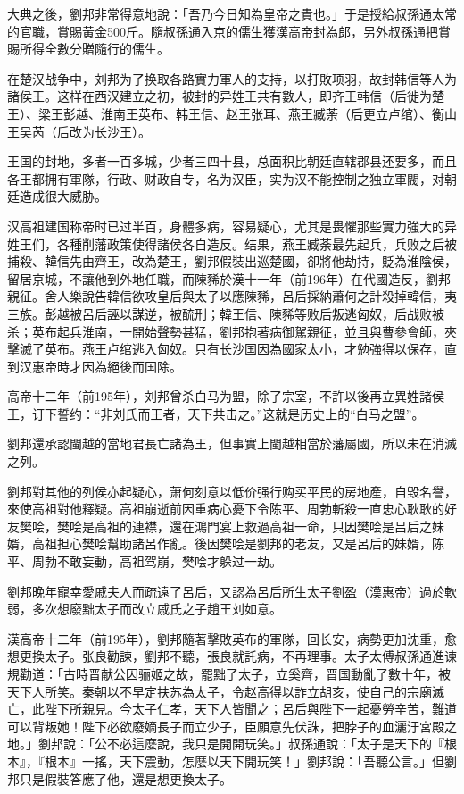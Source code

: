 大典之後，劉邦非常得意地說：「吾乃今日知為皇帝之貴也。」于是授給叔孫通太常的官職，賞賜黃金500斤。隨叔孫通入京的儒生獲漢高帝封為郎，另外叔孫通把賞賜所得全數分贈隨行的儒生。

在楚汉战争中，刘邦为了换取各路實力軍人的支持，以打敗项羽，故封韩信等人为諸侯王。这样在西汉建立之初，被封的异姓王共有數人，即齐王韩信（后徙为楚王）、梁王彭越、淮南王英布、韩王信、赵王张耳、燕王臧荼（后更立卢绾）、衡山王吴芮（后改为长沙王）。

王国的封地，多者一百多城，少者三四十县，总面积比朝廷直辖郡县还要多，而且各王都拥有軍隊，行政、财政自专，名为汉臣，实为汉不能控制之独立軍閥，对朝廷造成很大威胁。

汉高祖建国称帝时已过半百，身體多病，容易疑心，尤其是畏懼那些實力強大的异姓王们，各種削藩政策使得諸侯各自造反。结果，燕王臧荼最先起兵，兵败之后被捕殺、韓信先由齊王，改為楚王，劉邦假裝出巡楚國，卻將他劫持，貶為淮陰侯，留居京城，不讓他到外地任職，而陳豨於漢十一年（前196年）在代國造反，劉邦親征。舍人樂說告韓信欲攻皇后與太子以應陳豨，呂后採納蕭何之計殺掉韓信，夷三族。彭越被呂后誣以謀逆，被酼刑；韓王信、陳豨等败后叛逃匈奴，后战败被杀；英布起兵淮南，一開始聲勢甚猛，劉邦抱著病御駕親征，並且與曹參會師，夾擊滅了英布。燕王卢绾逃入匈奴。只有长沙国因為國家太小，才勉強得以保存，直到汉惠帝時才因為絕後而国除。

高帝十二年（前195年），刘邦曾杀白马为盟，除了宗室，不許以後再立異姓諸侯王，订下誓约：“非刘氏而王者，天下共击之。”这就是历史上的“白马之盟”。

劉邦還承認閩越的當地君長亡諸為王，但事實上閩越相當於藩屬國，所以未在消滅之列。

劉邦對其他的列侯亦起疑心，萧何刻意以低价强行购买平民的房地產，自毀名譽，來使高祖對他釋疑。高祖崩逝前因重病心憂下令陈平、周勃斬殺一直忠心耿耿的好友樊哙，樊哙是高祖的連襟，還在鴻門宴上救過高祖一命，只因樊哙是吕后之妹婿，高祖担心樊哙幫助諸呂作亂。後因樊哙是劉邦的老友，又是呂后的妹婿，陈平、周勃不敢妄動，高祖驾崩，樊哙才躲过一劫。

劉邦晚年寵幸愛戚夫人而疏遠了呂后，又認為呂后所生太子劉盈（漢惠帝）過於軟弱，多次想廢黜太子而改立戚氏之子趙王刘如意。

漢高帝十二年（前195年），劉邦隨著擊敗英布的軍隊，回长安，病勢更加沈重，愈想更換太子。张良勸諫，劉邦不聽，張良就託病，不再理事。太子太傅叔孫通進谏規勸道：「古時晋献公因骊姬之故，罷黜了太子，立奚齊，晋国動亂了數十年，被天下人所笑。秦朝以不早定扶苏為太子，令赵高得以詐立胡亥，使自己的宗廟滅亡，此陛下所親見。今太子仁孝，天下人皆聞之；呂后與陛下一起憂勞辛苦，難道可以背叛她！陛下必欲廢嫡長子而立少子，臣願意先伏誅，把脖子的血灑汙宮殿之地。」劉邦說：「公不必這麼說，我只是開開玩笑。」叔孫通說：「太子是天下的『根本』，『根本』一搖，天下震動，怎麼以天下開玩笑！」劉邦說：「吾聽公言。」但劉邦只是假裝答應了他，還是想更換太子。

